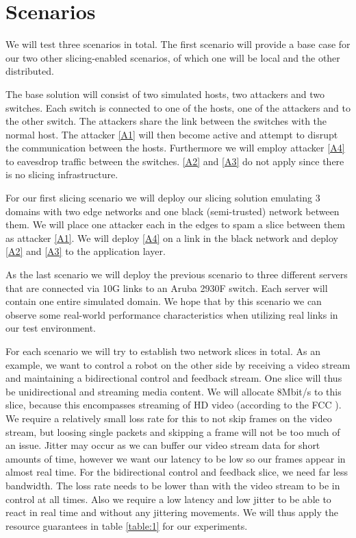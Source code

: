 \section{Scenarios}
We will test three scenarios in total. The first scenario will provide a base case for our two other slicing-enabled scenarios, of which one will be local and the other distributed.

The base solution will consist of two simulated hosts, two attackers and two switches. Each switch is connected to one of the hosts, one of the attackers and to the other switch. The attackers share the link between the switches with the normal host. The attacker \ref{A1} will then become active and attempt to disrupt the communication between the hosts. Furthermore we will employ attacker \ref{A4} to eavesdrop traffic between the switches. \ref{A2} and \ref{A3} do not apply since there is no slicing infrastructure.

For our first slicing scenario we will deploy our slicing solution emulating 3 domains with two edge networks and one black (semi-trusted) network between them. We will place one attacker each in the edges to spam a slice between them as attacker \ref{A1}. We will deploy \ref{A4} on a link in the black network and deploy \ref{A2} and \ref{A3} to the application layer.

As the last scenario we will deploy the previous scenario to three different servers that are connected via 10G links to an Aruba 2930F switch. Each server will contain one entire simulated domain. We hope that by this scenario we can observe some real-world performance characteristics when utilizing real links in our test environment.

For each scenario we will try to establish two network slices in total. As an example, we want to control a robot on the other side by receiving a video stream and maintaining a bidirectional control and feedback stream. One slice will thus be unidirectional and streaming media content. We will allocate 8Mbit/s to this slice, because this encompasses streaming of HD video (according to the FCC \cite{fcc}). We require a relatively small loss rate for this to not skip frames on the video stream, but loosing single packets and skipping a frame will not be too much of an issue. Jitter may occur as we can buffer our video stream data for short amounts of time, however we want our latency to be low so our frames appear in almost real time. For the bidirectional control and feedback slice, we need far less bandwidth. The loss rate needs to be lower than with the video stream to be in control at all times. Also we require a low latency and low jitter to be able to react in real time and without any jittering movements. We will thus apply the resource guarantees in table \ref{table:1} for our experiments.


